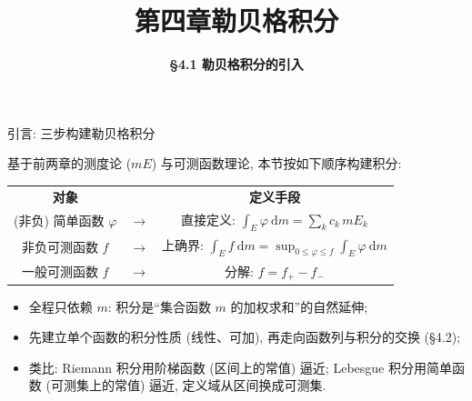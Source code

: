 


\title[第四章\\
勒贝格积分]{\texorpdfstring{\LARGE \bfseries 第四章\quad 勒贝格积分}{第四章 勒贝格积分}} %
\author[\S 4.1\\
勒贝格积分的引入] %
{\Large \bfseries \S 4.1 勒贝格积分的引入}
\date{}





\begin{frame}

\titlepage

\end{frame}




\begin{frame}{引言: 三步构建勒贝格积分}

基于前两章的\alert{测度论} ($mE$) 与\alert{可测函数}理论, 本节按如下顺序构建积分:

\begin{center}
\begin{tabular}{ccc}
\textbf{对象} & \quad & \textbf{定义手段} \\[0.2em]
(非负) 简单函数 $\varphi$ & $\longrightarrow$ & 直接定义: $\int_E \varphi ~ \mathrm{d} m = \sum_k c_k\, m E_k$ \\
非负可测函数 $f$ & $\longrightarrow$ & 上确界: $\displaystyle \int_E f ~ \mathrm{d} m = \sup_{0 \leqslant \varphi \leqslant f} \int_E \varphi ~ \mathrm{d} m$ \\
一般可测函数 $f$ & $\longrightarrow$ & 分解: $f = f_+ - f_-$
\end{tabular}
\end{center}

\pause

\begin{itemize}
\item 全程只依赖 $m$: 积分是``集合函数 $m$ 的加权求和''的自然延伸;
\item 先建立\alert{单个函数}的积分性质 (线性、可加), 再走向\alert{函数列与积分}的交换 (§4.2);
\item 类比: Riemann 积分用\alert{阶梯函数} (区间上的常值) 逼近;
  Lebesgue 积分用\alert{简单函数} (可测集上的常值) 逼近, 定义域从区间换成可测集.
\end{itemize}

\end{frame}

